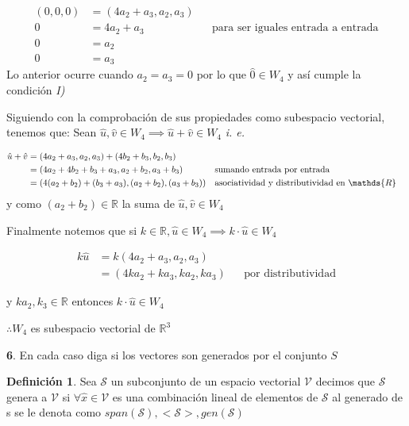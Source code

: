 \documentclass[letterpaper]{article}
\newcommand{\R}{\mathds{R}}
\renewcommand{\*}{\cdot}
\theoremstyle{definition}
\newtheorem{definition}{Definición}
\begin{document}
\begin{tasks}
\begin{align*}
	(0,0,0) &= (4a_2 + a_3, a_2, a_3) \\
	0 &= 4a_2 + a_3 && \text{para ser iguales entrada a entrada}\\
	0 &= a_2 && \\
	0 &= a_3 && 
\end{align*}
Lo anterior ocurre cuando $ a_2 = a_3 = 0 $ por lo que $ \hat{0} \in W_4 $ y así cumple la condición \textit{I)}

Siguiendo con la comprobación de sus propiedades como subespacio vectorial, tenemos que: Sean $ \hat{u}, \hat{v} \in W_4 \implies \hat{u} + \hat{v} \in W_4 $ \textit{i. e.}

\begin{align*}
		\hat{u} + \hat{v} &= (4a_2 + a_3, a_2, a_3) + (4b_2 + b_3, b_2, b_3)\\
		&= (4a_2 + 4b_2 + b_3 + a_3, a_2 + b_2, a_3 + b_3) && \text{sumando entrada por entrada}\\
		&= (4(a_2 + b_2) + (b_3 + a_3), (a_2 + b_2), (a_3 + b_3)) && \text{asociatividad y distributividad en $ \R $}\\
\end{align*}
y como $ (a_2 + b_2) \in \R $ la suma de $ \hat{u}, \hat{v} \in W_4 $

Finalmente notemos que si $ k \in \R, \hat{u} \in W_4 \implies k\* \hat{u} \in W_4 $ 

\begin{align*}
	k\hat{u} & = k(4a_2 + a_3, a_2, a_3)\\
	 & = (4ka_2 + ka_3, ka_2, ka_3) && \text{por distributividad}
\end{align*}

y $ ka_2, k_3 \in \R $ entonces $ k\*\hat{u} \in W_4 $

$ \therefore W_4 $ es subespacio vectorial de $ \R^3 $
\end{tasks}


\noindent \textbf{6}. En cada caso diga si los vectores son generados por el conjunto $S$ \\

\begin{definition}
	Sea $ \mathcal{S} $ un subconjunto de un espacio vectorial $ \mathcal{V} $ decimos que $ \mathcal{S} $ genera a $ \mathcal{V} $ si $ \forall \hat{x} \in \mathcal{V} $ es una combinación lineal de elementos de $ \mathcal{S} $ al generado de s se le denota como $ span(\mathcal{S}), <\mathcal{S}>, gen(\mathcal{S})$ 
\end{definition}
\end{document}
